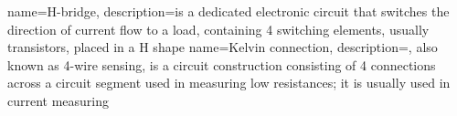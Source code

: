 {
    name=H-bridge,
    description={is a dedicated electronic circuit that switches the direction of current flow to a load, containing 4 switching elements, usually transistors, placed in a H shape}
}
{
    name=Kelvin connection,
    description={, also known as 4-wire sensing, is a circuit construction consisting of 4 connections across a circuit segment used in measuring low resistances; it is usually used in current measuring}
}

